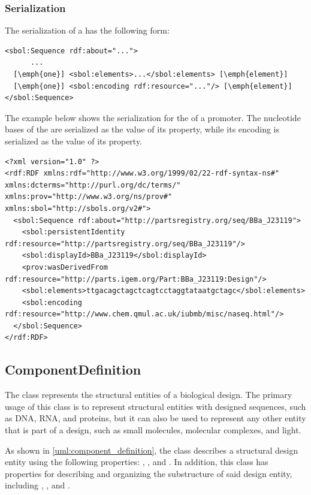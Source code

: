 \subsubsection*{Serialization}
The serialization of a  has the following form:
\begin{lstlisting}
<sbol:Sequence rdf:about="...">
      ...
  [\emph{one}] <sbol:elements>...</sbol:elements> [\emph{element}]
  [\emph{one}] <sbol:encoding rdf:resource="..."/> [\emph{element}]
</sbol:Sequence>
\end{lstlisting}

The example below shows the serialization for the  of a promoter. The nucleotide bases of the  are serialized as the  value of its  property, while its  encoding is serialized as the  value of its   property. 

\begin{lstlisting}
<?xml version="1.0" ?>
<rdf:RDF xmlns:rdf="http://www.w3.org/1999/02/22-rdf-syntax-ns#" xmlns:dcterms="http://purl.org/dc/terms/" xmlns:prov="http://www.w3.org/ns/prov#" xmlns:sbol="http://sbols.org/v2#">
  <sbol:Sequence rdf:about="http://partsregistry.org/seq/BBa_J23119">
    <sbol:persistentIdentity rdf:resource="http://partsregistry.org/seq/BBa_J23119"/>
    <sbol:displayId>BBa_J23119</sbol:displayId>
    <prov:wasDerivedFrom rdf:resource="http://parts.igem.org/Part:BBa_J23119:Design"/>
    <sbol:elements>ttgacagctagctcagtcctaggtataatgctagc</sbol:elements>
    <sbol:encoding rdf:resource="http://www.chem.qmul.ac.uk/iubmb/misc/naseq.html"/>
  </sbol:Sequence>
</rdf:RDF>
\end{lstlisting}


\subsection{ComponentDefinition}
\label{sec:ComponentDefinition}

The  class represents the structural entities of a biological design. The primary usage of this class is to represent structural entities with designed sequences, such as DNA, RNA, and proteins, but it can also be used to represent any other entity that is part of a design, such as small molecules, molecular complexes, and light. 

As shown in \ref{uml:component_definition}, the  class describes a structural design entity using the following properties: , , and . In addition, this class has properties for describing and organizing the substructure of said design entity, including , , and  .


